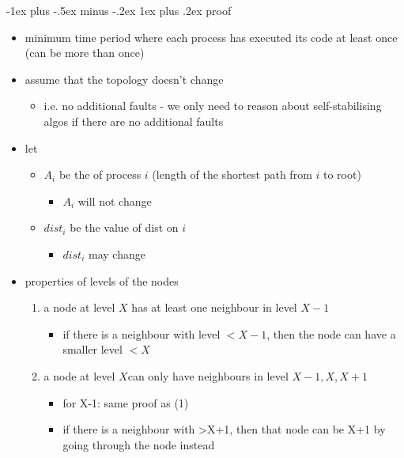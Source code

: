 \documentclass[10pt, landscape]{article}
\makeatletter
\renewcommand{\subsubsection}{\@startsection{subsubsection}{3}{0mm}%
  {-1ex plus -.5ex minus -.2ex}%
  {1ex plus .2ex}%
{\normalfont\small\bfseries}}%
\makeatother
\begin{document}
\begin{multicols*}{3}
  \subsubsection{proof}

  \begin{itemize}
    \item {} minimum time period where each process has executed its code at least once (can be more than once)
    \item assume that the topology doesn’t change
      \begin{itemize}
        \item i.e. no additional faults - we only need to reason about self-stabilising algos if there are no additional faults
      \end{itemize}
    \item let
      \begin{itemize}
        \item $A_i$ be the  of process $i$ (length of the shortest path from $i$ to root)
          \begin{itemize}
            \item $A_i$ will not change
          \end{itemize}
        \item $dist_i$ be the value of dist on $i$
          \begin{itemize}
            \item $dist_i$ may change
          \end{itemize}
      \end{itemize}
    \item properties of levels of the nodes
      \begin{enumerate}
        \item a node at level $X$ has at least one neighbour in level $X-1$
          \begin{itemize}
            \item if there is a neighbour with level $<X-1$, then the node can have a smaller level $<X$
          \end{itemize}
        \item a node at level $X$can only have neighbours in level $X-1,X,X+1$
          \begin{itemize}
            \item for X-1: same proof as (1)
            \item if there is a neighbour with >X+1, then that node can be X+1 by going through the node instead

\end{itemize}
\end{enumerate}
\end{itemize}
\end{multicols*}
\end{document}
